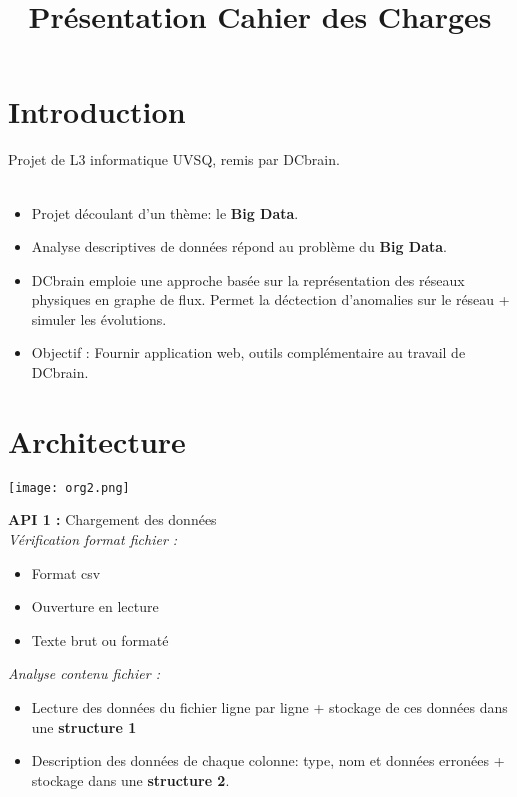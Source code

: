 
\usepackage{../tex/myInfolines}
\usepackage{longtable,array}
\title{Présentation Cahier des Charges}



	\begin{frame}
		\titlepage
	\end{frame}
	
	\section{Introduction}
		\begin{frame}
			Projet de L3 informatique UVSQ, remis par DCbrain.\\~\\
		\begin{itemize}
		\item Projet découlant d'un thème: le \textbf{Big Data}.
		\item Analyse descriptives de données répond au problème du \textbf{Big Data}.
		\item DCbrain emploie une approche basée sur la représentation des réseaux physiques en graphe de flux. Permet la déctection d'anomalies sur le réseau + simuler les évolutions.
		\item Objectif : Fournir application web, outils complémentaire au travail de DCbrain.
		\end{itemize}
		\end{frame}
	
	\section{Architecture}
			\begin{frame}
		\begin{center}\texttt{[image: org2.png]}\end{center}
	\end{frame}
	
	\begin{frame}
		\textbf{API 1 :} Chargement des données\\
		\textit{Vérification format fichier :}
		\begin{itemize}
			\item Format csv
			\item Ouverture en lecture
			\item Texte brut ou formaté
		\end{itemize} \pause
		\vspace{1cm}
		\textit{Analyse contenu fichier :}
		\begin{itemize}
			\item  Lecture des données du fichier ligne par ligne + stockage de ces données dans une \textbf{structure 1} 
			\item Description des données de chaque colonne: type, nom et données erronées + stockage dans une \textbf{structure 2}.
		\end{itemize}		 		
	\end{frame}
	

